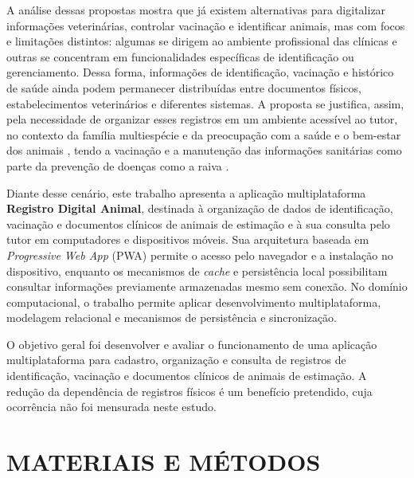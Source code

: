 \documentclass{UNESC}
\begin{document}
A análise dessas propostas mostra que já existem alternativas para digitalizar informações veterinárias, controlar vacinação e identificar animais, mas com focos e limitações distintos: algumas se dirigem ao ambiente profissional das clínicas e outras se concentram em funcionalidades específicas de identificação ou gerenciamento. Dessa forma, informações de identificação, vacinação e histórico de saúde ainda podem permanecer distribuídas entre documentos físicos, estabelecimentos veterinários e diferentes sistemas. A proposta se justifica, assim, pela necessidade de organizar esses registros em um ambiente acessível ao tutor, no contexto da família multiespécie e da preocupação com a saúde e o bem-estar dos animais \cite{VIEIRA2020}, tendo a vacinação e a manutenção das informações sanitárias como parte da prevenção de doenças como a raiva \cite{MOUTINHO2017,murphy2008}.

Diante desse cenário, este trabalho apresenta a aplicação multiplataforma \textbf{Registro Digital Animal}, destinada à organização de dados de identificação, vacinação e documentos clínicos de animais de estimação e à sua consulta pelo tutor em computadores e dispositivos móveis. Sua arquitetura baseada em \textit{Progressive Web App} (PWA) permite o acesso pelo navegador e a instalação no dispositivo, enquanto os mecanismos de \textit{cache} e persistência local possibilitam consultar informações previamente armazenadas mesmo sem conexão. No domínio computacional, o trabalho permite aplicar desenvolvimento multiplataforma, modelagem relacional e mecanismos de persistência e sincronização.

O objetivo geral foi desenvolver e avaliar o funcionamento de uma aplicação multiplataforma para cadastro, organização e consulta de registros de identificação, vacinação e documentos clínicos de animais de estimação. A redução da dependência de registros físicos é um benefício pretendido, cuja ocorrência não foi mensurada neste estudo.

\section{MATERIAIS E MÉTODOS}
\end{document}
